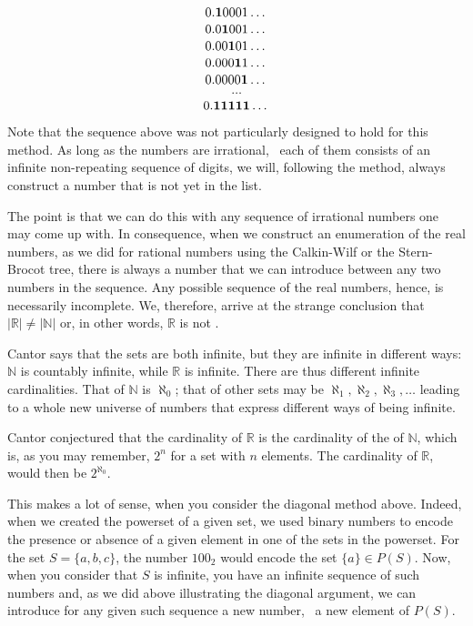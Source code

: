 \documentclass[tikz]{scrreprt}
\begin{document}
\begin{minipage}{\textwidth}
\[
0.\mathbf{1}0001\dots\\
\]
\[
0.0\mathbf{1}001\dots\\
\]
\[
0.00\mathbf{1}01\dots\\
\]
\[
0.000\mathbf{1}1\dots\\
\]
\[
0.0000\mathbf{1}\dots\\
\]
\[
\dots
\]
\[
0.\mathbf{11111}\dots\\
\]
\end{minipage}

Note that the sequence above was not particularly
designed to hold for this method. As long as the numbers are
irrational, \ie\ each of them consists of an infinite 
non-repeating sequence of digits, we will, 
following the method, always construct a number
that is not yet in the list.

The point is that we can do this with any sequence
of irrational numbers one may come up with.
In consequence, when we construct an enumeration 
of the real numbers, as we did for rational
numbers using the Calkin-Wilf or the Stern-Brocot tree,
there is always a number that we can introduce
between any two numbers in the sequence.
Any possible sequence of the real numbers, hence,
is necessarily incomplete.
We, therefore, arrive at the strange conclusion
that $|\mathbb{R}|\neq|\mathbb{N}|$ or,
in other words, $\mathbb{R}$ is not .

Cantor says that the sets are both infinite,
but they are infinite in different ways:
$\mathbb{N}$ is countably infinite, while
$\mathbb{R}$ is  infinite.
There are thus different infinite cardinalities.
That of $\mathbb{N}$ is $\aleph_0$;
that of other sets may be $\aleph_1, \aleph_2, \aleph_3,\dots$
leading to a whole new universe of numbers
that express different ways of being infinite.

Cantor conjectured that the cardinality of $\mathbb{R}$
is the cardinality of the  of $\mathbb{N}$,
which is, as you may remember, $2^n$ for a set with $n$
elements. The cardinality of $\mathbb{R}$, would then be
$2^{\aleph_0}$.

This makes a lot of sense, 
when you consider the diagonal method above.
Indeed, when we created the powerset of a given set,
we used binary numbers to encode the presence or absence
of a given element in one of the sets in the powerset.
For the set $S=\lbrace a,b,c\rbrace$, the number $100_2$
would encode the set $\lbrace a\rbrace \in P(S)$.
Now, when you consider that $S$ is infinite,
you have an infinite sequence of such numbers and,
as we did above illustrating the diagonal argument,
we can introduce for any given such sequence
a new number, \ie\ a new element of $P(S)$.
\end{document}

